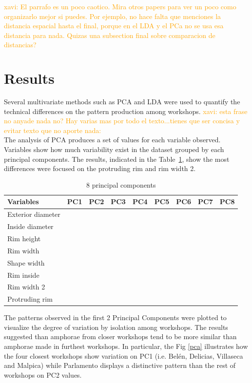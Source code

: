 \documentclass[review]{elsarticle}
\newcommand{\memo}[2]{\textcolor{#1}{#2}}
\newcommand{\xavi}[1]{\memo{orange}{xavi: #1\\}}
\begin{document}
\xavi{El parrafo es un poco caotico. Mira otros papers para ver un poco como organizarlo mejor si puedes. Por ejemplo, no hace falta que menciones la distancia espacial hasta el final, porque en el LDA y el PCa no se usa esa distancia para nada. Quizas una subsection final sobre comparacion de distancias?}


\section{Results}

Several multivariate methods such as PCA and LDA were used to quantify the technical differences on the pattern production among workshops. \xavi{esta frase no anyade nada no? Hay varias mas por todo el texto...tienes que ser concisa y evitar texto que no aporte nada: }The analysis of PCA produces a set of values for each variable observed. Variables show how much variability exist in the dataset grouped by each principal components. The results, indicated in the Table~\ref{table:variable}, show the most differences were focused on the protruding rim and rim width 2. 

\begin{table}[htp]
\begin{tabular}{lcccccccc}
\hline
 Variables		&        PC1 & PC2	& PC3 & PC4 & PC5 & PC6 & PC7 & PC8     \\ \hline
 Exterior diameter	& 		 &		&	  &  	&	  &	    &     &           \\
 Inside diameter  	& 		 &		&	  &   	&	  &	    &     &           \\
 Rim height          &        &      &     &     &     &     &     &           \\
 Rim width        	&		 &		&	  &  	&	  &		&	  &          \\
 Shape width         &		 &		&	  &  	&	  &		&     &          \\
 Rim inside          &		 &	    &	  &     &	  &		&	  &          \\                                    
 Rim width 2		     & 	     &	    &	  & 		&	  &		&	  &          \\	
 Protruding rim		&        &      &      &     &     &     &     &          \\
\hline
\end{tabular}
\caption{8 principal components}
\label{table:variable}
\end{table}


The patterns observed in the first 2 Principal Components were plotted to visualize the degree of variation by isolation among workshops. The results suggested than amphorae from closer workshops tend to be more similar than amphorae made in furthest workshops. In particular, the Fig \ref{pca} illustrates how the four closest workshops show variation on PC1 (i.e. Bel\'en, Delicias, Villaseca and Malpica) while Parlamento displays a distinctive pattern than the rest of workshops on PC2 values. 
\end{document}
